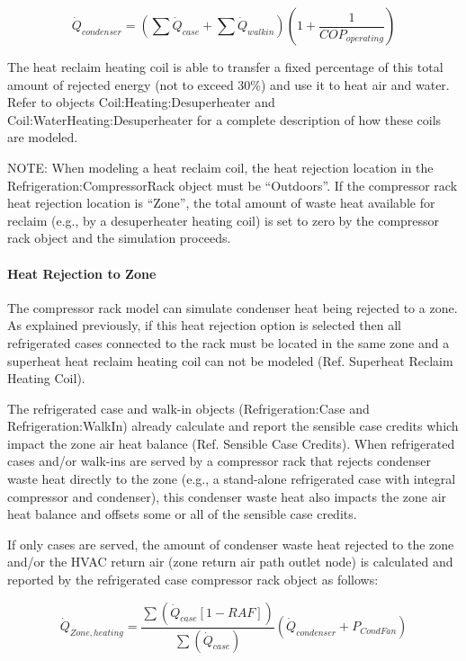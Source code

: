 \begin{equation}
{\dot Q_{condenser}} = \left( {\sum {{{\dot Q}_{case}} + \left. {\sum {{{\dot Q}_{walkin}}} } \right)} } \right.\left( {1 + \left. {\frac{1}{{CO{P_{operating}}}}} \right)} \right.
\end{equation}

The heat reclaim heating coil is able to transfer a fixed percentage of this total amount of rejected energy (not to exceed 30\%) and use it to heat air and water. Refer to objects Coil:Heating:Desuperheater and Coil:WaterHeating:Desuperheater for a complete description of how these coils are modeled.

NOTE: When modeling a heat reclaim coil, the heat rejection location in the Refrigeration:CompressorRack object must be ``Outdoors''. If the compressor rack heat rejection location is ``Zone'', the total amount of waste heat available for reclaim (e.g., by a desuperheater heating coil) is set to zero by the compressor rack object and the simulation proceeds.

\paragraph{Heat Rejection to Zone}\label{heat-rejection-to-zone}

The compressor rack model can simulate condenser heat being rejected to a zone. As explained previously, if this heat rejection option is selected then all refrigerated cases connected to the rack must be located in the same zone and a superheat heat reclaim heating coil can not be modeled (Ref. Superheat Reclaim Heating Coil).

The refrigerated case and walk-in objects (Refrigeration:Case and Refrigeration:WalkIn) already calculate and report the sensible case credits which impact the zone air heat balance (Ref. Sensible Case Credits). When refrigerated cases and/or walk-ins are served by a compressor rack that rejects condenser waste heat directly to the zone (e.g., a stand-alone refrigerated case with integral compressor and condenser), this condenser waste heat also impacts the zone air heat balance and offsets some or all of the sensible case credits.

If only cases are served, the amount of condenser waste heat rejected to the zone and/or the HVAC return air (zone return air path outlet node) is calculated and reported by the refrigerated case compressor rack object as follows:

\begin{equation}
{\dot Q_{Zone,heating}} = \frac{{\sum {\left( {{{\dot Q}_{case}}[1 - RAF]} \right)} }}{{\sum {\left( {{{\dot Q}_{case}}} \right)} }} \left( {{{\dot Q}_{condenser}} + {P_{CondFan}}} \right)
\end{equation}

